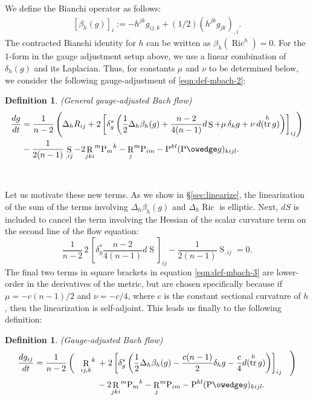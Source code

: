 \documentclass[10pt,reqno]{amsart}
\newtheorem{definition}[theorem]{Definition}
\DeclareMathOperator{\tr}{tr}
\DeclareMathOperator{\Rc}{R}
\DeclareMathOperator{\Ric}{Ric}
\renewcommand{\P}{\mathrm{P}}
\DeclareMathOperator{\Scal}{S}
\DeclareMathOperator{\R}{R}
\begin{document}
We define the Bianchi operator as follows: 
\begin{align}
\label{def-Bianchi}
[\beta_h(g)]_i := -h^{jk} g_{ij,k} + (1/2) (h^{jk} g_{jk})_{,i}.
\end{align}
The contracted Bianchi identity for $h$ can be written as $\beta_h( \Ric^h ) = 0$.   For the $1$-form in the gauge adjustment setup above, we use
a linear combination of $\delta_h(g)$ and its Laplacian. Thus, for constants $\mu$ and $\nu$ to be determined below, we consider the following gauge-adjustment 
of \eqref{eqn:def-mbach-2}:
\begin{definition}(General gauge-adjusted Bach flow) 
\begin{align}
\label{eqn:def-mbach-3}
\nonumber \frac{ dg}{dt} &= \frac{1}{n-2} \left(\Delta_h R_{ij}  + 2 \left[ \delta_{g}^* \left( \frac{1}{2} \Delta_h \beta_h (g) + \frac{n-2}{4(n-1)} d\Scal  + \mu \, \delta_h g + \nu \, d( \tr^h g )  \right) \right]_{ij} \right) \\
&  - \frac{1}{2(n-1)}  \Scal_{,ij} - 2 {\R_{jki}}^m {\P_{m}}^k - {\Rc_{j}}^m \P_{im} - \P^{kl} (\P \owedge g)_{kijl}. 
\end{align}
\end{definition}

\ 

Let us motivate these new terms. 
As we show in \S \ref{sec:linearize}, the linearization of the sum of the terms involving $\Delta_h \beta_h (g)$ and $\Delta_h \Ric$ is elliptic. Next, $dS$ is included to 
cancel the term involving the Hessian of the scalar curvature term on the second line of the flow equation: 
\[
\frac{1}{n-2} \,2 \, \left[ \delta_g^* \frac{n-2}{4(n-1)} d\Scal \right]_{ij} - \frac{1}{2(n-1)} \Scal_{,ij} = 0. 
\]  
The final two terms in square brackets in equation \eqref{eqn:def-mbach-3} are lower-order in the derivatives of the metric, but are chosen specifically because if $\mu = -c(n-1)/2$ and $\nu = -c/4$,  where $c$ is the constant sectional curvature of $h$, then the linearization is self-adjoint.  This leads us finally to the following definition: 
\begin{definition}(Gauge-adjusted Bach flow)
\begin{align}
\label{eqn:def-mbach-3.5} 
\nonumber \frac{ dg_{ij}}{dt} = \frac{1}{n-2} \left( \phantom{\frac{1}{1}} {\Rc_{ij,k}}^k  \right. & \left. + \; 2 \left[ \delta_{g}^* \left( \frac{1}{2} \Delta_h \beta_h (g)  -\frac{c(n-1)}{2} \delta_h g - \frac{c}{4} d( \tr^h g ) \right) \right]_{ij} \phantom{\frac{1}{1}} \right) \\
& - 2 {\R_{jki}}^m {\P_{m}}^k - {\Rc_{j}}^m \P_{im} - \P^{kl} (\P \owedge g)_{kijl}. 
\end{align}
\end{definition}
\end{document}
